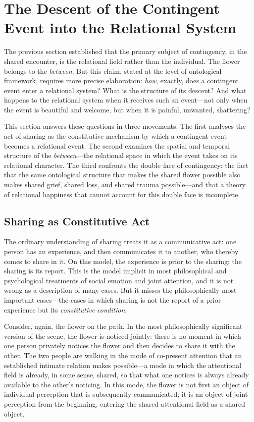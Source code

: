 \section{The Descent of the Contingent Event into the Relational System}
\label{p14:sec:event}

\noindent
The previous section established that the primary subject of contingency, in the shared encounter, is the relational field rather than the individual. The flower belongs to the \emph{between}. But this claim, stated at the level of ontological framework, requires more precise elaboration: \emph{how}, exactly, does a contingent event enter a relational system? What is the structure of its descent? And what happens to the relational system when it receives such an event---not only when the event is beautiful and welcome, but when it is painful, unwanted, shattering?

This section answers these questions in three movements. The first analyses the act of sharing as the constitutive mechanism by which a contingent event becomes a relational event. The second examines the spatial and temporal structure of the \emph{between}---the relational space in which the event takes on its relational character. The third confronts the double face of contingency: the fact that the same ontological structure that makes the shared flower possible also makes shared grief, shared loss, and shared trauma possible---and that a theory of relational happiness that cannot account for this double face is incomplete.

\subsection{Sharing as Constitutive Act}
\label{p14:subsec:sharing}

\noindent
The ordinary understanding of sharing treats it as a communicative act: one person has an experience, and then communicates it to another, who thereby comes to share in it. On this model, the experience is prior to the sharing; the sharing is its report. This is the model implicit in most philosophical and psychological treatments of social emotion and joint attention, and it is not wrong as a description of many cases. But it misses the philosophically most important cases---the cases in which sharing is not the report of a prior experience but its \emph{constitutive condition}.

Consider, again, the flower on the path. In the most philosophically significant version of the scene, the flower is noticed jointly: there is no moment in which one person privately notices the flower and then decides to share it with the other. The two people are walking in the mode of co-present attention that an established intimate relation makes possible---a mode in which the attentional field is already, in some sense, shared, so that what one notices is always already available to the other's noticing. In this mode, the flower is not first an object of individual perception that is subsequently communicated; it is an object of joint perception from the beginning, entering the shared attentional field as a shared object.

